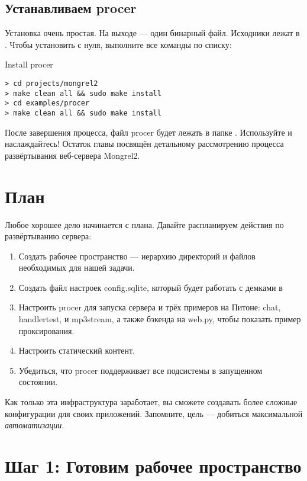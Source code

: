 \subsection{Устанавливаем procer}

Установка очень простая. На выходе --- один бинарный файл. Исходники лежат в
. Чтобы установить с нуля, выполните все команды по
списку:

\begin{code}{Install procer}
\begin{lstlisting}
> cd projects/mongrel2
> make clean all && sudo make install
> cd examples/procer
> make clean all && sudo make install
\end{lstlisting}
\end{code}

После завершения процесса, файл procer будет лежать в папке
. Используйте и наслаждайтесь! Остаток главы посвящён
детальному рассмотрению процесса развёртывания веб-сервера Mongrel2.

\section{План}

Любое хорошее дело начинается с плана. Давайте распланируем действия по
развёртыванию сервера:

\begin{enumerate}
\item Создать рабочее пространство --- иерархию директорий и файлов необходимых
    для нашей задачи.
\item Создать файл настроек config.sqlite, который будет работать с демками в
\item Настроить procer для запуска сервера и трёх примеров на Питоне: chat,
    handlertest, и mp3stream, а также бэкенда на web.py, чтобы показать пример
    проксирования.
\item Настроить статический контент.
\item Убедиться, что procer поддерживает все подсистемы в запущенном состоянии.
\end{enumerate}

Как только эта инфраструктура заработает, вы сможете создавать более сложные
конфигурации для своих приложений. Запомните, цель --- добиться максимальной
\emph{автоматизации}.

\section{Шаг 1: Готовим рабочее пространство}

